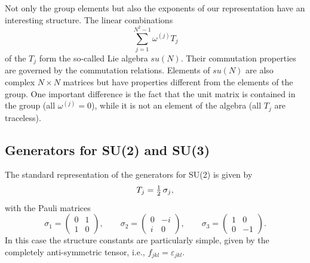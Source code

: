 Not only the group elements but also the exponents of our representation have
an interesting structure. The linear combinations
\begin{equation}
  \sum_{j=1}^{N^2-1}\omega^{(j)} T_j
\end{equation}
of the $T_j$ form the so-called Lie algebra $su(N)$. Their commutation
properties are governed by the commutation relations. Elements of $su(N)$ are
also complex $N\times N$ matrices but have properties different from the
elements of the group. One important difference is the fact that the unit
matrix is contained in the group (all $\omega^{(j)} = 0$), while it is not an
element of the algebra (all $T_j$ are traceless).

\subsection{Generators for SU(2) and SU(3)}

The standard representation of the generators for SU(2) is given by
\begin{equation}
  T_j = \tfrac{1}{2}\,\sigma_j,
\end{equation}
with the Pauli matrices
\begin{equation}
  \sigma_1 = \begin{pmatrix} 0 & 1 \\ 1 & 0 \end{pmatrix},\qquad
  \sigma_2 = \begin{pmatrix} 0 & -i \\ i & 0 \end{pmatrix},\qquad
  \sigma_3 = \begin{pmatrix} 1 & 0 \\ 0 & -1 \end{pmatrix}.
\end{equation}
In this case the structure constants are particularly simple, given by the
completely anti-symmetric tensor, i.e., $f_{jkl} = \varepsilon_{jkl}$.

